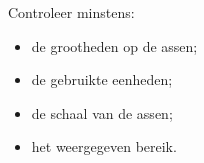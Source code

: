 \documentclass{ximera}
\begin{document}
\begin{oefening}{\oefU \ESS}
\begin{question}
\begin{oplossing}
Controleer minstens:
\begin{itemize}
  \item de grootheden op de assen;
  \item de gebruikte eenheden;
  \item de schaal van de assen;
  \item het weergegeven bereik.
\end{itemize}
\end{oplossing}

\end{question}

\end{oefening}


\end{document}
